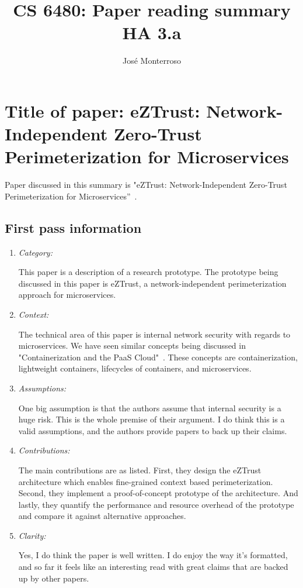 \documentclass[letterpaper,twocolumn,10pt]{article}
\title{CS 6480: Paper reading summary\\
HA 3.a\\}
\author{José Monterroso}
\affil{School of Computing, University of Utah}
\begin{document}
\maketitle

\section{Title of paper: eZTrust: Network-Independent Zero-Trust Perimeterization for Microservices}

Paper discussed in this summary is "eZTrust: Network-Independent Zero-Trust Perimeterization for Microservices''~\cite{ez}.

\subsection{First pass information}
\label{sec:first}

\begin{enumerate}

\item {\it Category:}

This paper is a description of a research prototype. The prototype being discussed in this paper is eZTrust, a 
network-independent perimeterization approach for microservices. 

\item {\it Context:} 

The technical area of this paper is internal network security with regards to microservices. We have seen similar 
concepts being discussed in "Containerization and the PaaS Cloud"~\cite{containerization}. These concepts are
containerization, lightweight containers, lifecycles of containers, and microservices. 

\item {\it Assumptions:} 

One big assumption is that the authors assume that internal security is a huge risk. This is the whole premise of
their argument. I do think this is a valid assumptions, and the authors provide papers to back up their claims. 

\item {\it Contributions:}

The main contributions are as listed. First, they design the eZTrust architecture which enables fine-grained 
context based perimeterization. Second, they implement a proof-of-concept prototype of the architecture. 
And lastly, they quantify the performance and resource overhead of the prototype and compare it against 
alternative approaches. 

\item {\it Clarity:} 

Yes, I do think the paper is well written. I do enjoy the way it's formatted, and so far it feels like an interesting
read with great claims that are backed up by other papers. 

\end{enumerate}
\end{document}
